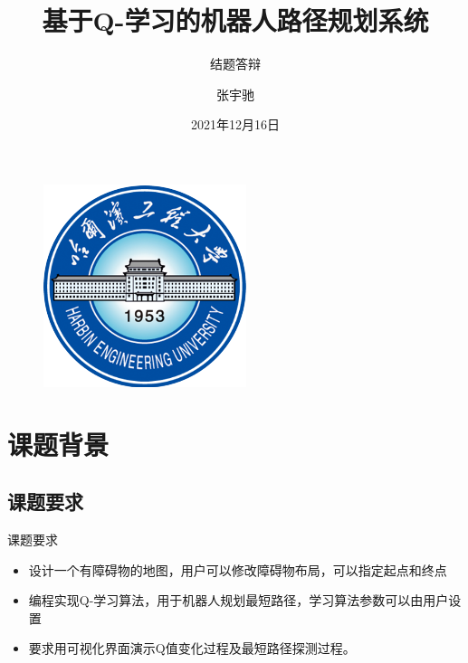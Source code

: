 \documentclass{beamer}
\author{张宇驰}
\title{基于Q-学习的机器人路径规划系统}
\subtitle{结题答辩}
\institute{人工智能第10组}
\date{2021年12月16日}
\begin{document}
\kaishu
\begin{frame}
    \titlepage
    \begin{figure}[htpb]
        \begin{center}
            \includegraphics[width=0.2\linewidth]{pic/heu.png}
        \end{center}
    \end{figure}
\end{frame}

\begin{frame}
    \tableofcontents[sectionstyle=show,subsectionstyle=show/shaded/hide,subsubsectionstyle=show/shaded/hide]
\end{frame}


\section{课题背景}


\subsection{课题要求}

\begin{frame}{课题要求}
    

    \begin{itemize}[<+-| alert@+>] %
        \item 设计一个有障碍物的地图，用户可以修改障碍物布局，可以指定起点和终点
        \item 编程实现Q-学习算法，用于机器人规划最短路径，学习算法参数可以由用户设置
        \item 要求用可视化界面演示Q值变化过程及最短路径探测过程。
    \end{itemize}

\end{frame}
\end{document}
